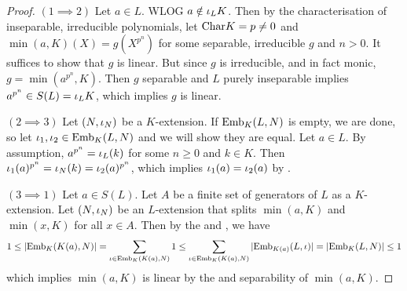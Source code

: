 \documentclass[main.tex]{subfiles}
\begin{document}
\begin{proof}
  $(1 \implies 2)$ Let $a \in L$. WLOG $a \notin \iota_L K$. 
  Then by the 
  {characterisation of inseparable, irreducible polynomials}, 
  let $\mathrm{Char}K = p \neq 0$ and 
  $\min(a,K)(X) = g(X^{p^n})$ for some separable, irreducible $g$
  and $n > 0$. 
  It suffices to show that $g$ is linear. 
  But since $g$ is irreducible, and in fact monic, 
  $g = \min(a^{p^n},K)$. 
  Then $g$ separable and $L$ purely inseparable implies 
  $a^{p^n} \in S(L) = \iota_L K$, 
  which implies $g$ is linear. 

  $(2\implies 3)$ Let $(N,\iota_N)$ be a $K$-extension.
  If $\mathrm{Emb}_{K}(L, N)$ is empty, we are done, 
  so let $\iota_1,\iota_2 \in \mathrm{Emb}_{K}(L, N)$ and we will show they are equal. 
  Let $a \in L$. 
  By assumption, $a^{p^n} = \iota_L(k)$ for some $n\geq 0$ and $k \in K$.  
  Then $\iota_1(a)^{p^n} = \iota_N(k) = \iota_2(a)^{p^n}$,
  which implies $\iota_1(a) = \iota_2(a)$ by . 

  $(3 \implies 1)$ Let $a \in S(L)$. 
  Let $A$ be a finite set of generators of $L$ as a $K$-extension. 
  Let $(N,\iota_N)$ be an $L$-extension that splits $\min(a,K)$ and 
  $\min(x,K)$ for all $x \in A$. 
  Then by the  and
  , we have 
  \[
    1 \leq |\mathrm{Emb}_{K}(K(a), N)| 
    = \sum_{\iota \in \mathrm{Emb}_{K}(K(a), N)} 1
    \leq \sum_{\iota \in \mathrm{Emb}_{K}(K(a), N)} |\mathrm{Emb}_{K(a)}(L, \iota)|
    = |\mathrm{Emb}_{K}(L, N)| \leq 1
  \]
  which implies $\min(a,K)$ is linear by 
  the  and 
  separability of $\min(a,K)$. 
\end{proof}
\end{document}
